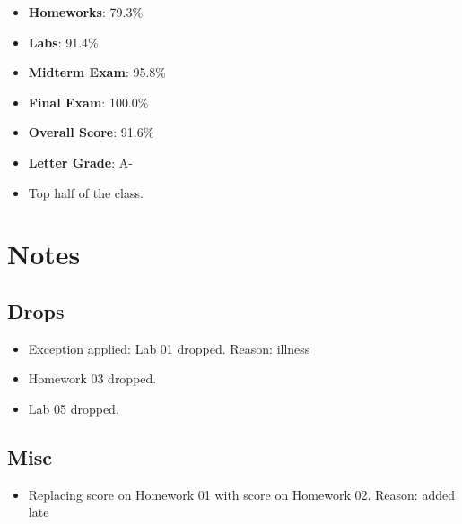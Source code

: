 \documentclass{article}
\begin{document}
\begin{itemize}


\item \textbf{Homeworks}: 79.3\%


\item \textbf{Labs}: 91.4\%


\item \textbf{Midterm Exam}: 95.8\%


\item \textbf{Final Exam}: 100.0\%


\end{itemize}

\begin{itemize}
    \item \textbf{Overall Score}: 91.6\%
    \item \textbf{Letter Grade}: A-


\item Top half of the class.


\end{itemize}

\section*{Notes}


\subsection*{Drops}

\begin{itemize}


\item Exception applied: Lab 01 dropped. Reason: illness


\item Homework 03 dropped.


\item Lab 05 dropped.


\end{itemize}


\subsection*{Misc}

\begin{itemize}


\item Replacing score on Homework 01 with score on Homework 02. Reason: added late


\end{itemize}
\end{document}
